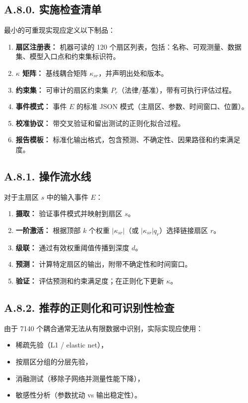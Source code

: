 \documentclass[11pt,a4paper]{article}
\begin{document}
	\subsection*{A.8.0. 实施检查清单}
	最小的可重现实现应定义以下制品：
	
	\begin{enumerate}[leftmargin=*]
		\item \textbf{扇区注册表：} 机器可读的 120 个扇区列表，包括：名称、可观测量、数据集、模型入口点和约束集标识符。
		\item \textbf{$\kappa$ 矩阵：} 基线耦合矩阵 $\kappa_{sr}$，并声明出处和版本。
		\item \textbf{约束集：} 可审计的扇区约束集 $P_r$（法律/基准），带有可执行评估过程。
		\item \textbf{事件模式：} 事件 $E$ 的标准 JSON 模式（主扇区、参数、时间窗口、位置）。
		\item \textbf{校准协议：} 带交叉验证和留出测试的正则化拟合过程。
		\item \textbf{报告模板：} 标准化输出格式，包含预测、不确定性、因果路径和约束满足度。
	\end{enumerate}
	
	\subsection*{A.8.1. 操作流水线}
	对于主扇区 $s$ 中的输入事件 $E$：
	\begin{enumerate}[leftmargin=*]
		\item \textbf{摄取：} 验证事件模式并映射到扇区 $s$。
		\item \textbf{一阶激活：} 根据顶部 $k$ 个权重 $|\kappa_{sr}|$（或 $|\kappa_{sr}|q_r$）选择链接扇区 $r$。
		\item \textbf{级联：} 通过有效权重阈值传播到深度 $d$。
		\item \textbf{预测：} 计算特定扇区的输出，附带不确定性和时间窗口。
		\item \textbf{验证：} 评估预测和约束满足度；在正则化下更新 $\kappa$。
	\end{enumerate}
	
	\subsection*{A.8.2. 推荐的正则化和可识别性检查}
	由于 7140 个耦合通常无法从有限数据中识别，实际实现应使用：
	\begin{itemize}[leftmargin=*]
		\item 稀疏先验（L1 / elastic net），
		\item 按扇区分组的分层先验，
		\item 消融测试（移除子网络并测量性能下降），
		\item 敏感性分析（参数扰动 vs 输出稳定性）。
	\end{itemize}
	
\end{document}
